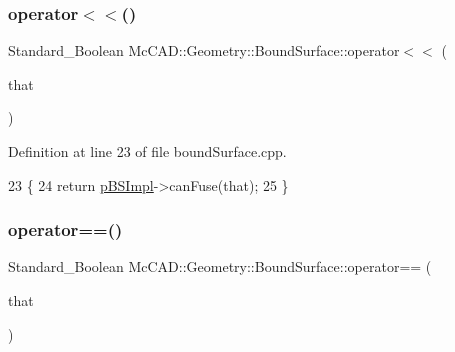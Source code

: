 \mbox{\label{classMcCAD_1_1Geometry_1_1BoundSurface_a2443caf3cbbe81e666df60745a92db28}} 
\subsubsection{\texorpdfstring{operator$<$$<$()}{operator<<()}\hspace{0.1cm}{\footnotesize\ttfamily [2/2]}}
{\footnotesize\ttfamily Standard\+\_\+\+Boolean Mc\+C\+A\+D\+::\+Geometry\+::\+Bound\+Surface\+::operator$<$$<$ (\begin{DoxyParamCaption}\item[{const \hyperlink{classMcCAD_1_1Geometry_1_1BoundSurface}{Bound\+Surface} \&}]{that }\end{DoxyParamCaption})}



Definition at line 23 of file bound\+Surface.\+cpp.


\begin{DoxyCode}
23                                                                             \{
24   \textcolor{keywordflow}{return} \hyperlink{classMcCAD_1_1Geometry_1_1BoundSurface_ae678fabb46e22b7a68a336051b366ddf}{pBSImpl}->canFuse(that);
25 \}
\end{DoxyCode}
\mbox{\label{classMcCAD_1_1Geometry_1_1BoundSurface_a5c7eafa600bd89b55fa06ddb9b21cc08}} 
\subsubsection{\texorpdfstring{operator==()}{operator==()}\hspace{0.1cm}{\footnotesize\ttfamily [1/2]}}
{\footnotesize\ttfamily Standard\+\_\+\+Boolean Mc\+C\+A\+D\+::\+Geometry\+::\+Bound\+Surface\+::operator== (\begin{DoxyParamCaption}\item[{const \hyperlink{classMcCAD_1_1Geometry_1_1BoundSurface}{Bound\+Surface} \&}]{that }\end{DoxyParamCaption})}



